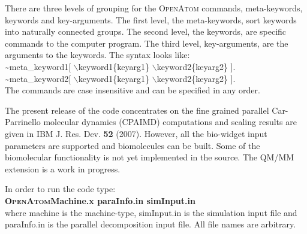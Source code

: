 \documentclass[12pt,titlepage]{article}
\begin{document}
There are three levels of grouping for the \textsc{OpenAtom} commands, 
meta-keywords, keywords and key-arguments.
The first level, the meta-keywords, sort keywords into naturally
connected groups. The second level, the keywords, are specific
commands to the computer program. The third level, key-arguments,
are the arguments to the keywords.  The syntax looks like: \\ 
\hspace*{0.5in} \~{}meta\_keyword1[ $\backslash$keyword1\{keyarg1\}
$\backslash$keyword2\{keyarg2\} ]. \\
\hspace*{0.5in} \~{}meta\_keyword2[ $\backslash$keyword1\{keyarg1\}
$\backslash$keyword2\{keyarg2\} ]. \\
The commands are case insensitive and can be specified in any order.

The present release of the code concentrates on the fine grained
parallel Car-Parrinello molecular dynamics (CPAIMD) computations 
and scaling results are given in IBM J. Res. Dev. {\bf 52} (2007). 
However, all the 
bio-widget input parameters are supported and biomolecules can be
built. Some of the biomolecular functionality is not yet implemented
in the source. The QM/MM extension is a work in progress.

In order to run the code type: \\
\hspace*{1.5in} {\bf \textsc{OpenAtom}Machine.x paraInfo.in simInput.in} \\
where machine is the machine-type, simInput.in is the simulation input
file and paraInfo.in is the parallel decomposition input file. 
All file names are arbitrary.
\end{document}
